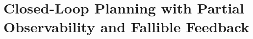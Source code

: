 \chapter{Closed-Loop Planning with Partial Observability and Fallible Feedback}
\label{ch:C10}










